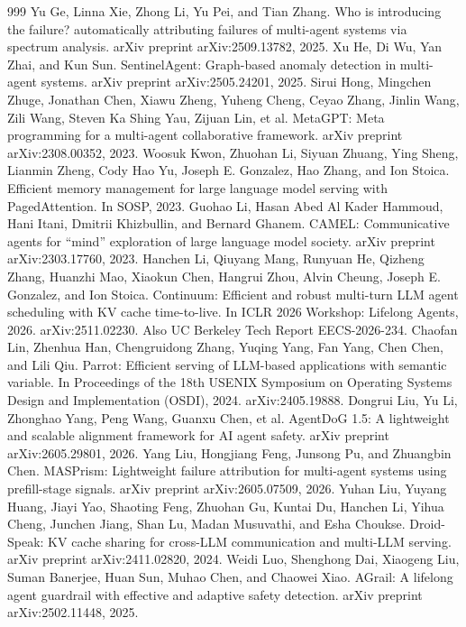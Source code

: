 \documentclass[preprint,12pt]{elsarticle}
\begin{document}
\begin{thebibliography}{999}
 Yu Ge, Linna Xie, Zhong Li, Yu Pei, and Tian Zhang. Who is introducing the failure? automatically attributing failures of multi-agent systems via spectrum analysis. arXiv preprint arXiv:2509.13782, 2025.
 Xu He, Di Wu, Yan Zhai, and Kun Sun. SentinelAgent: Graph-based anomaly detection in multi-agent systems. arXiv preprint arXiv:2505.24201, 2025.
 Sirui Hong, Mingchen Zhuge, Jonathan Chen, Xiawu Zheng, Yuheng Cheng, Ceyao Zhang, Jinlin Wang, Zili Wang, Steven Ka Shing Yau, Zijuan Lin, et al. MetaGPT: Meta programming for a multi-agent collaborative framework. arXiv preprint arXiv:2308.00352, 2023.
 Woosuk Kwon, Zhuohan Li, Siyuan Zhuang, Ying Sheng, Lianmin Zheng, Cody Hao Yu, Joseph E. Gonzalez, Hao Zhang, and Ion Stoica. Efficient memory management for large language model serving with PagedAttention. In SOSP, 2023.
 Guohao Li, Hasan Abed Al Kader Hammoud, Hani Itani, Dmitrii Khizbullin, and Bernard Ghanem. CAMEL: Communicative agents for ``mind'' exploration of large language model society. arXiv preprint arXiv:2303.17760, 2023.
 Hanchen Li, Qiuyang Mang, Runyuan He, Qizheng Zhang, Huanzhi Mao, Xiaokun Chen, Hangrui Zhou, Alvin Cheung, Joseph E. Gonzalez, and Ion Stoica. Continuum: Efficient and robust multi-turn LLM agent scheduling with KV cache time-to-live. In ICLR 2026 Workshop: Lifelong Agents, 2026. arXiv:2511.02230. Also UC Berkeley Tech Report EECS-2026-234.
 Chaofan Lin, Zhenhua Han, Chengruidong Zhang, Yuqing Yang, Fan Yang, Chen Chen, and Lili Qiu. Parrot: Efficient serving of LLM-based applications with semantic variable. In Proceedings of the 18th USENIX Symposium on Operating Systems Design and Implementation (OSDI), 2024. arXiv:2405.19888.
 Dongrui Liu, Yu Li, Zhonghao Yang, Peng Wang, Guanxu Chen, et al. AgentDoG 1.5: A lightweight and scalable alignment framework for AI agent safety. arXiv preprint arXiv:2605.29801, 2026.
 Yang Liu, Hongjiang Feng, Junsong Pu, and Zhuangbin Chen. MASPrism: Lightweight failure attribution for multi-agent systems using prefill-stage signals. arXiv preprint arXiv:2605.07509, 2026.
 Yuhan Liu, Yuyang Huang, Jiayi Yao, Shaoting Feng, Zhuohan Gu, Kuntai Du, Hanchen Li, Yihua Cheng, Junchen Jiang, Shan Lu, Madan Musuvathi, and Esha Choukse. Droid- Speak: KV cache sharing for cross-LLM communication and multi-LLM serving. arXiv preprint arXiv:2411.02820, 2024.
 Weidi Luo, Shenghong Dai, Xiaogeng Liu, Suman Banerjee, Huan Sun, Muhao Chen, and Chaowei Xiao. AGrail: A lifelong agent guardrail with effective and adaptive safety detection. arXiv preprint arXiv:2502.11448, 2025.

\end{thebibliography}
\end{document}
